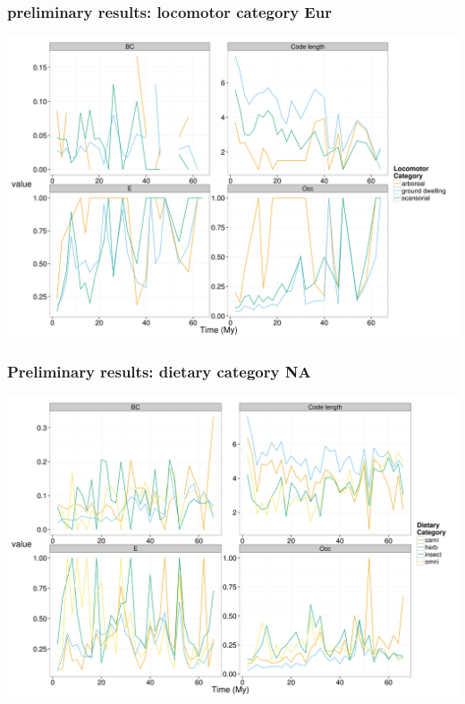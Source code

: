 \documentclass{beamer}
\begin{document}
\begin{frame}
  \frametitle{preliminary results: locomotor category Eur}

  \begin{center}
    \includegraphics[height = 0.8\textheight, width = \textwidth, keepaspectratio = true]{figure/er_lf}
  \end{center}
\end{frame}

\begin{frame}
  \frametitle{Preliminary results: dietary category NA}

  \begin{center}
    \includegraphics[height = 0.8\textheight, width = \textwidth, keepaspectratio = true]{figure/na_dt}
  \end{center}
\end{frame}
\end{document}
